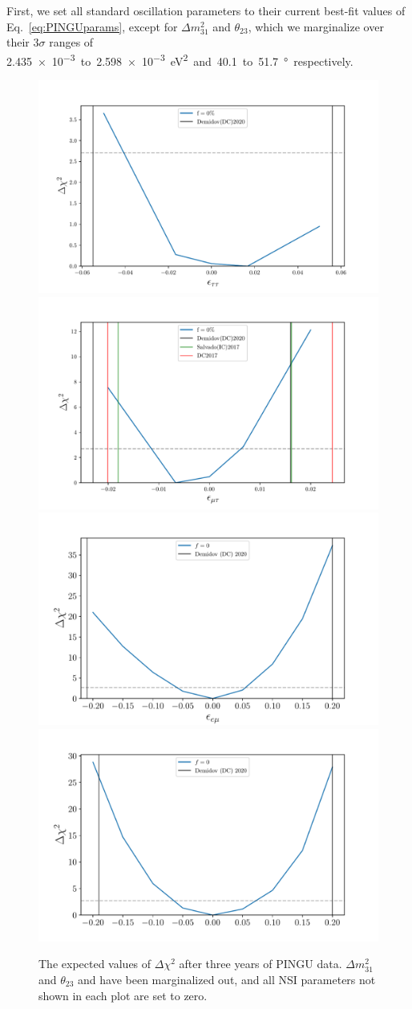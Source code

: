 \documentclass[draft=True]{revtex4-2}
\newcommand{\dm}{\Delta m^2_{31}}
\begin{document}
First, we set all standard oscillation parameters to their current best-fit values of Eq.~\ref{eq:PINGUparams}, except for $\dm$ and $\theta_{23}$, 
which we marginalize over their $3\sigma$ ranges of \SI{2.435e-3} to \SI{2.598e-3}{\electronvolt^2} and \SI{40.1} to \SI{51.7}{\degree} respectively. %

 \begin{figure}[!tb]
    \begin{center}
       \includegraphics[width=0.45\linewidth]{figures/PINGU_3D_ett.pdf}
       \includegraphics[width=0.45\linewidth]{figures/PINGU_3D_emt.pdf}
       \includegraphics[width=0.45\linewidth]{figures/PINGU_3D_eem.pdf}
       \includegraphics[width=0.45\linewidth]{figures/PINGU_3D_eet.pdf}
    \end{center}
    \caption{The expected values of $\Delta \chi^2$ after three years of PINGU data. $\dm$ and $\theta_{23}$ and have been marginalized out, and all NSI 
    parameters not shown in each plot are set to zero.}\label{fig:PINGU_3D}
 \end{figure}
\end{document}
